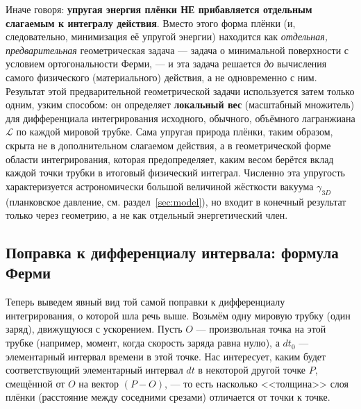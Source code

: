 \documentclass[12pt,a4paper]{article}
\begin{document}
Иначе говоря: \textbf{упругая энергия плёнки НЕ прибавляется отдельным
слагаемым к интегралу действия}. Вместо этого форма плёнки (и,
следовательно, минимизация её упругой энергии) находится как
\emph{отдельная, предварительная} геометрическая задача --- задача о
минимальной поверхности с условием ортогональности Ферми, --- и эта
задача решается \emph{до} вычисления самого физического (материального)
действия, а не одновременно с ним. Результат этой предварительной
геометрической задачи используется затем только одним, узким
способом: он определяет \textbf{локальный вес} (масштабный множитель)
для дифференциала интегрирования исходного, обычного, объёмного
лагранжиана $\mathcal L$ по каждой мировой трубке. Сама упругая
природа плёнки, таким образом, скрыта не в дополнительном слагаемом
действия, а в геометрической форме области интегрирования, которая
предопределяет, каким весом берётся вклад каждой точки трубки в
итоговый физический интеграл. Численно эта упругость характеризуется
астрономически большой величиной жёсткости вакуума $\gamma_{3D}$
(планковское давление, см. раздел~\ref{sec:model}), но входит в
конечный результат только через геометрию, а не как отдельный
энергетический член.

\subsection{Поправка к дифференциалу интервала: формула Ферми}
\label{sec:fermi-correction}

Теперь выведем явный вид той самой поправки к дифференциалу
интегрирования, о которой шла речь выше. Возьмём одну мировую трубку
(один заряд), движущуюся с ускорением. Пусть $O$ --- произвольная
точка на этой трубке (например, момент, когда скорость заряда равна
нулю), а $dt_0$ --- элементарный интервал времени в этой точке. Нас
интересует, каким будет соответствующий элементарный интервал $dt$ в
некоторой другой точке $P$, смещённой от $O$ на вектор
$(P-O)$, --- то есть насколько <<толщина>> слоя плёнки (расстояние
между соседними срезами) отличается от точки к точке.
\end{document}
